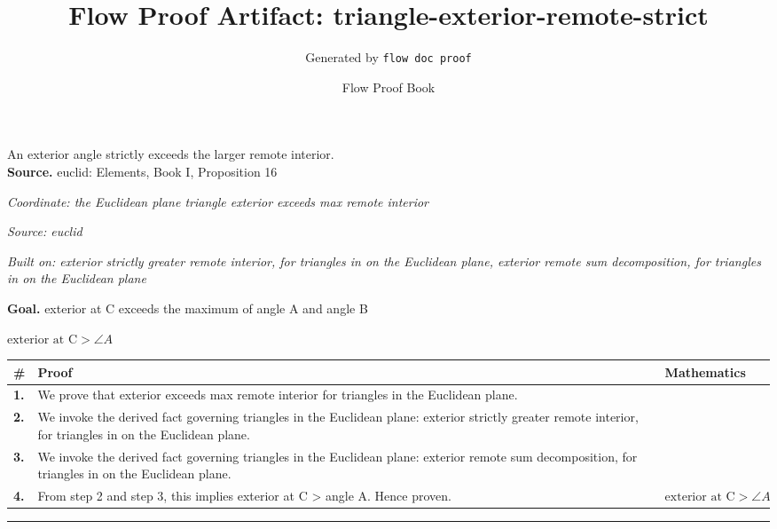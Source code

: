 \documentclass[11pt]{article}
\title{Flow Proof Artifact: triangle-exterior-remote-strict}
\author{Generated by \texttt{flow doc proof}}
\date{Flow Proof Book}
\theoremstyle{definition}
\begin{document}
\maketitle
An exterior angle strictly exceeds the larger remote interior.\\[0.5em]
\textbf{Source.} euclid: Elements, Book I, Proposition 16\\[0.5em]
\bigskip
{}\par
\smallskip\noindent\textit{Coordinate: the Euclidean plane \cdot triangle \cdot exterior exceeds max remote interior}\par
\smallskip\noindent\textit{Source: euclid}\par
\smallskip\noindent\textit{Built on: exterior strictly greater remote interior, for triangles in on the Euclidean plane, exterior remote sum decomposition, for triangles in on the Euclidean plane}\par
\medskip
\noindent\textbf{Goal.} exterior at C exceeds the maximum of angle A and angle B\par
\noindent$\displaystyle \text{exterior at C} > \angle A$\par
\medskip
\noindent
\begin{tabular}{@{} >{\raggedright\arraybackslash}p{} >{\raggedright\arraybackslash}p{} >{\raggedleft\arraybackslash}p{} @{}}
\textbf{\#} & \textbf{Proof} & \textbf{Mathematics} \\
\midrule
\textbf{1.} & We prove that exterior exceeds max remote interior for triangles in the Euclidean plane. & \\[0.45em]
\textbf{2.} & We invoke the derived fact governing triangles in the Euclidean plane: exterior strictly greater remote interior, for triangles in on the Euclidean plane. & \\[0.45em]
\textbf{3.} & We invoke the derived fact governing triangles in the Euclidean plane: exterior remote sum decomposition, for triangles in on the Euclidean plane. & \\[0.45em]
\textbf{4.} & From step 2 and step 3, this implies exterior at C > angle A. Hence proven. & $\displaystyle \text{exterior at C} > \angle A$ \\[0.45em]
\bottomrule
\end{tabular}
\label{thm:Geometry-triangle-exterior_exceeds_max_remote_interior}
\par\medskip\hrule
\end{document}
